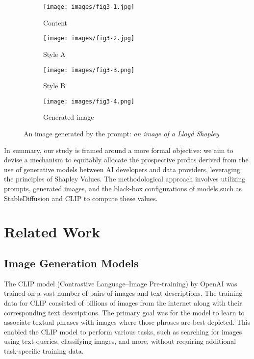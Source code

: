 \documentclass[12pt, letterpaper]{article}
\begin{document}
\begin{figure}[h!]
    \centering
    
    \begin{subfigure}{0.24\textwidth}
        \texttt{[image: images/fig3-1.jpg]}
        \caption{Content}
    \end{subfigure}
    \hfill
    \begin{subfigure}{0.24\textwidth}
        \texttt{[image: images/fig3-2.jpg]}
        \caption{Style A}
    \end{subfigure}
    \hfill
    \begin{subfigure}{0.24\textwidth}
        \texttt{[image: images/fig3-3.png]}
        \caption{Style B}
    \end{subfigure}
    \hfill
    \begin{subfigure}{0.24\textwidth}
        \texttt{[image: images/fig3-4.png]}
        \caption{Generated image}
    \end{subfigure}
    
    \centering
    \caption{An image generated by the prompt: \textit{an image of a Lloyd Shapley}}
    \label{fig:figure_3}
\end{figure}
In summary, our study is framed around a more formal objective: we aim to devise a mechanism to equitably allocate the prospective profits derived from the use of generative models between AI developers and data providers, leveraging the principles of Shapley Values. The methodological approach involves utilizing prompts, generated images, and the black-box configurations of models such as StableDiffusion and CLIP to compute these values.

\section{Related Work}

\subsection{Image Generation Models}

The CLIP model (Contrastive Language–Image Pre-training) by OpenAI \cite{radford2021learning} was trained on a vast number of pairs of images and text descriptions. The training data for CLIP consisted of billions of images from the internet along with their corresponding text descriptions. The primary goal was for the model to learn to associate textual phrases with images where those phrases are best depicted. This enabled the CLIP model to perform various tasks, such as searching for images using text queries, classifying images, and more, without requiring additional task-specific training data.
\end{document}
